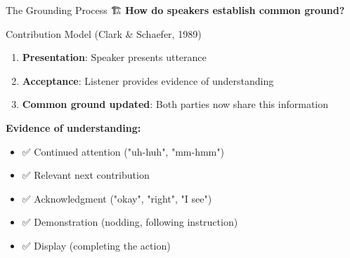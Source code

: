 \documentclass[aspectratio=169]{beamer}
\begin{document}
\begin{frame}[shrink=10]{The Grounding Process 🏗️}
\small
    \textbf{How do speakers establish common ground?}

    \vspace{0.3cm}

    \begin{block}{Contribution Model (Clark \& Schaefer, 1989)}
        \begin{enumerate}\setlength{\itemsep}{0pt}
            \item \textbf{Presentation}: Speaker presents utterance
            \item \textbf{Acceptance}: Listener provides evidence of understanding
            \item \textbf{Common ground updated}: Both parties now share this information
        \end{enumerate}
    \end{block}

    \vspace{0.3cm}

    \textbf{Evidence of understanding:}
    \begin{itemize}\setlength{\itemsep}{0pt}
        \item ✅ Continued attention ("uh-huh", "mm-hmm")
        \item ✅ Relevant next contribution
        \item ✅ Acknowledgment ("okay", "right", "I see")
        \item ✅ Demonstration (nodding, following instruction)
        \item ✅ Display (completing the action)
    \end{itemize}
\end{frame}
\end{document}
